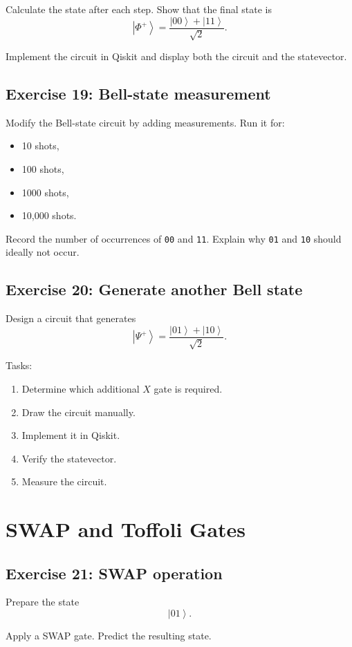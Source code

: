 \documentclass[12pt,a4paper]{article}
\newcommand{\ket}[1]{\left|#1\right\rangle}
\begin{document}
Calculate the state after each step. Show that the final state is
\[
\ket{\Phi^+}
=
\frac{\ket{00}+\ket{11}}{\sqrt{2}}.
\]

Implement the circuit in Qiskit and display both the circuit and the statevector.

\subsection*{Exercise 19: Bell-state measurement}
Modify the Bell-state circuit by adding measurements. Run it for:
\begin{itemize}
    \item 10 shots,
    \item 100 shots,
    \item 1000 shots,
    \item 10,000 shots.
\end{itemize}

Record the number of occurrences of \texttt{00} and \texttt{11}. Explain why \texttt{01} and \texttt{10} should ideally not occur.

\subsection*{Exercise 20: Generate another Bell state}
Design a circuit that generates
\[
\ket{\Psi^+}
=
\frac{\ket{01}+\ket{10}}{\sqrt{2}}.
\]

Tasks:
\begin{enumerate}
    \item Determine which additional $X$ gate is required.
    \item Draw the circuit manually.
    \item Implement it in Qiskit.
    \item Verify the statevector.
    \item Measure the circuit.
\end{enumerate}

\section{SWAP and Toffoli Gates}

\subsection*{Exercise 21: SWAP operation}
Prepare the state
\[
\ket{01}.
\]

Apply a SWAP gate. Predict the resulting state.
\end{document}
